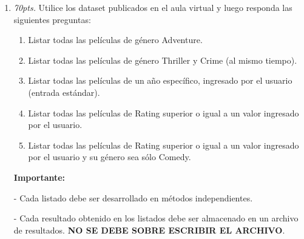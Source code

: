 \documentclass[10pt]{article}
\begin{document}
{\begin{enumerate}
		\newpage

		\item \emph{70pts.} Utilice los dataset publicados en el aula virtual y luego responda las siguientes preguntas:
		
		\begin{enumerate}
		    \item Listar todas las pel\'iculas de g\'enero Adventure.
		    \item Listar todas las pel\'iculas de g\'enero Thriller y Crime (al mismo tiempo).
           \item Listar todas las pel\'iculas de un a\~no espec\'ifico, ingresado por el usuario (entrada est\'andar).
           \item Listar todas las pel\'iculas de Rating superior o igual a un valor ingresado por el usuario.
           \item Listar todas las pel\'iculas de Rating superior o igual a un valor ingresado por el usuario y su g\'enero sea s\'olo Comedy.
		\end{enumerate}
	\end{enumerate}

   
    \begin{enumerate}
        \item[ ] \textbf{Importante:}
		\item[-] Cada listado debe ser desarrollado en m\'etodos independientes.
		\item[-] Cada resultado obtenido en los listados debe ser almacenado en un archivo de resultados. \textbf{NO SE DEBE SOBRE ESCRIBIR EL ARCHIVO}.
    \end{enumerate}
}
\end{document}
